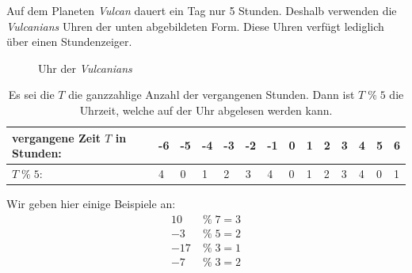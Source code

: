 \begin{myexample}\label{myexample:clock}
Auf dem Planeten \textit{Vulcan} dauert ein Tag nur 5 Stunden. Deshalb verwenden die \textit{Vulcanians} Uhren der unten abgebildeten Form. Diese Uhren verfügt lediglich über einen Stundenzeiger.
\begin{figure}[H]
	\centering
	\caption{Uhr der \textit{Vulcanians}}
\end{figure}

\begin{table}[H]
	\begin{tabular}{|l|l|l|l|l|l|l|l|l|l|l|l|l|l|}
		\hline
		{\color[HTML]{FE0000} vergangene Zeit $T$ in Stunden:} & {\color[HTML]{FE0000} -6} & {\color[HTML]{FE0000} -5} & {\color[HTML]{FE0000} -4} & {\color[HTML]{FE0000} -3} & {\color[HTML]{FE0000} -2} & {\color[HTML]{FE0000} -1} & {\color[HTML]{FE0000} 0} & {\color[HTML]{FE0000} 1} & {\color[HTML]{FE0000} 2} & {\color[HTML]{FE0000} 3} & {\color[HTML]{FE0000} 4} & {\color[HTML]{FE0000} 5} & {\color[HTML]{FE0000} 6} \\ \hline
		{\color[HTML]{3531FF} $T\; \% \; 5$:}                  & {\color[HTML]{3531FF} 4}  & {\color[HTML]{3531FF} 0}  & {\color[HTML]{3531FF} 1}  & {\color[HTML]{3531FF} 2}  & {\color[HTML]{3531FF} 3}  & {\color[HTML]{3531FF} 4}  & {\color[HTML]{3531FF} 0} & {\color[HTML]{3531FF} 1} & {\color[HTML]{3531FF} 2} & {\color[HTML]{3531FF} 3} & {\color[HTML]{3531FF} 4} & {\color[HTML]{3531FF} 0} & {\color[HTML]{3531FF} 1} \\ \hline
	\end{tabular}
	\caption{Es sei die $T$ die ganzzahlige Anzahl der vergangenen Stunden. Dann ist $T\; \% \; 5$ die Uhrzeit, welche auf der Uhr abgelesen werden kann.}
\end{table}
\end{myexample}

\begin{myexample}
Wir geben hier einige Beispiele an:
\begin{align*}
	10 \; & \% \; 7 = 3 \\
	-3 \; & \% \; 5 = 2 \\
	-17\; & \% \; 3 = 1 \\
	-7 \; & \% \; 3 = 2
\end{align*}
\end{myexample}

